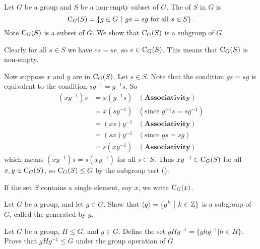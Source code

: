 \begin{example}\label{example-centralizer-of-a-subset}
    Let $G$ be a group and $S$ be a non-empty subset of $G$. The  of $S$ in $G$ is
    \[
        \Centralizer{G}{S} = \left\{g \in G \vert gs = sg \text{ for all } s \in S\right\}.
    \]
    Note $\mathrm{C}_{G}(S)$ is a subset of $G$. We show that $\mathrm{C}_{G}(S)$ is a subgroup of $G$.

    Clearly for all $s \in S$ we have $es = se$, so $e \in \mathrm{C}_{G}(S)$. This means that $\mathrm{C}_{G}(S)$ is non-empty.

    Now suppose $x$ and $y$ are in $\mathrm{C}_{G}(S)$. Let $s \in S$. Note that the condition $gs = sg$ is equivalent to the condition $sg^{-1} = g^{-1}s$. So
    \begin{align*}
        (xy^{-1})s &= x(y^{-1}s) & (\textbf{Associativity})\\
        &= x(sy^{-1}) & (\text{since } g^{-1}s = sg^{-1})\\
        &= (xs)y^{-1} & (\textbf{Associativity})\\
        &= (sx)y^{-1} & (\text{since } gs = sg)\\
        &= s(xy^{-1}) & (\textbf{Associativity})
    \end{align*}
    which means $(xy^{-1})s = s(xy^{-1})$ for all $s \in S$. Thus $xy^{-1} \in \mathrm{C}_{G}(S)$ for all $x, y \in \mathrm{C}_{G}(S)$, so $\mathrm{C}_{G}(S) \leq G$ by the subgroup test ().
\end{example}
\begin{remark}
    If the set $S$ contains a single element, say $x$, we write $\mathrm{C}_{G}(x)$.
\end{remark}

\begin{exercise}
    Let $G$ be a group, and let $g \in G$. Show that $\langle g \rangle = \{g^k \vert k \in \Z\}$ is a subgroup of $G$, called the  generated by $g$.
\end{exercise}

\begin{exercise}\label{exercise-conjugate-subgroup}
    Let $G$ be a group, $H \leq G$, and $g \in G$. Define the set $gHg^{-1} = \{ghg^{-1} \vert h \in H\}$. Prove that $gHg^{-1} \leq G$ under the group operation of $G$.
\end{exercise}

